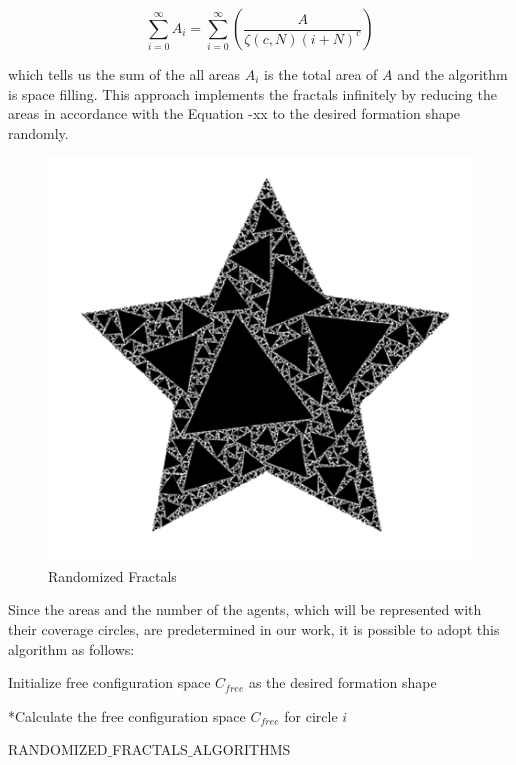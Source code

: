 \documentclass[twoside]{article}
\begin{document}
		\begin{equation}
		\sum_{i=0}^{\infty}A_i = \sum_{i = 0}^{\infty}\left(\frac{A}{\zeta(c,N)(i+N)^c}\right)
		\end{equation}
	
		which tells us the sum of the all areas $A_i$ is the total area of $A$ and the algorithm is space filling. This approach implements the fractals infinitely by reducing the areas in accordance with the Equation -xx to the desired formation shape randomly. 
				\begin{figure}[H]
					\caption{Randomized Fractals}
					\centering
					\includegraphics[scale = 0.70]{randomized}
				\end{figure}
		

		
		Since the areas and the number of the agents, which will be represented with their coverage circles, are predetermined in our work, it is possible to adopt this algorithm as follows:
		
					\begin{algorithm}[H]
						
						Initialize free configuration space $C_{free}$ as the desired formation shape
						
						{		
							*Calculate the free configuration space $C_{free}$ for circle $i$\;
												
						}												
						
						\caption{RANDOMIZED$\_$FRACTALS$\_$ALGORITHMS}
					\end{algorithm}
	
\end{document}
